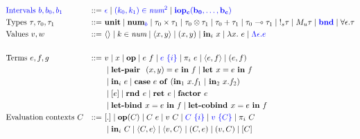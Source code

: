 \begin{figure}[tbp]
  \begin{alignat*}{3}
    &\bnd{\text{Intervals } b, b_0, b_1} &::=~ &\bnd{\epsilon}
         \mid \bnd{(k_0, k_1) \in \textit{num}^{2}}
         \mid \bnd{\mathbf{iop_c(b_0, \ldots, b_c)}} \\
         &\text{Types } \tau, \tau_0, \tau_1 &::=~ &\mathbf{unit}
         \mid \num_{\bnd{b}}
         \mid \tau_0 \times \tau_1
         \mid \tau_0 \otimes \tau_1
         \mid \tau_0 + \tau_1
         \mid \tau_0 \multimap \tau_1
         \mid {\bang{s} \tau}
         \mid {M_u \tau}
         \mid \bnd{\textbf{bnd}}
         \mid \forall \epsilon . \tau
         \\
         &\text{Values } v, w \ &::=~ &\langle \rangle
         \mid k \in \textit{num}
         \mid \langle x,y \rangle 
         \mid (x, y)
         \mid \tin_i \ x
         \mid \lambda x.~e
         \mid \bnd{\Lambda \epsilon . e} \\
         \\
         &\text{Terms } e, f, g &::=~ &v
         \mid x
         \mid \mathbf{op}
         \mid e~f
         \mid \bnd{e~\{i\}}
         \mid {\pi}_i\ e
         \mid \langle e,f \rangle 
         \mid (e, f) \\
         & & & \mid \letpair \ (x,y) = e \ \tin \ f
         \mid \letassign x  = e \ \tin \ f \\
         & & & \mid \tin_i \ e
         \mid 
          \mathbf{case} \ e \ \mathbf{of} \ (\tin_1 \ x.f_1 \ | \ \tin_2 \ x.f_2) \\
         & & &
         \mid [e]
         \mid \rnd e
         \mid {\ret e} 
         \mid \factor e \\
         & & & 
         \mid {\letbind x = e \ \tin \ f}
         \mid \letcobind x = e \ \tin \ f
         \\
         &\text{Evaluation contexts } C &::=~ &[.] 
         \mid \mathbf{op}(C) 
         \mid C~e 
         \mid v~C 
         \mid \bnd{C~\{i\}}
         \mid \bnd{v~\{C\}}
         \mid \pi_i~C \\
         & & &
         \mid \mathbf{in}_i~C
         \mid \langle C, e \rangle
         \mid \langle v, C \rangle
         \mid (C, e)
         \mid (v, C)
         \mid [ C ] \\

\end{alignat*}
\end{figure}

